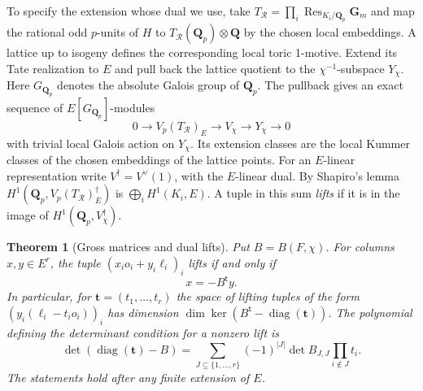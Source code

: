 \documentclass[11pt]{amsart}
\numberwithin{equation}{section}
\newtheorem{theorem}{Theorem}[section]
\theoremstyle{definition}
\theoremstyle{remark}
\newcommand{\Q}{\mathbf Q}
\newcommand{\Gm}{\mathbf G_m}
\newcommand{\Res}{\operatorname{Res}}
\begin{document}
To specify the extension whose dual we use, take
$T_{\mathcal R}=\prod_i\Res_{K_i/\Q_p}\Gm$ and map the rational
odd $p$-units of $H$ to $T_{\mathcal R}(\Q_p)\otimes\Q$ by the
chosen local embeddings. A lattice up to isogeny defines the
corresponding local toric 1-motive. Extend its Tate realization to
$E$ and pull back the lattice quotient to the $\chi^{-1}$-subspace
$Y_\chi$. Here $G_{\Q_p}$ denotes the absolute Galois group of $\Q_p$.
The pullback gives an exact sequence of $E[G_{\Q_p}]$-modules
\[
 0\longrightarrow V_p(T_{\mathcal R})_E
 \longrightarrow V_\chi\longrightarrow Y_\chi\longrightarrow0
\]
with trivial local Galois action on $Y_\chi$. Its extension classes
are the local Kummer classes of the chosen embeddings of the
lattice points. For an $E$-linear representation write $V^\dagger=V^\vee(1)$,
with the $E$-linear dual.
By Shapiro's lemma $H^1(\Q_p,V_p(T_{\mathcal R})_E^\dagger)$ is
$\bigoplus_i H^1(K_i,E)$. A tuple in this sum \emph{lifts} if it is
in the image of $H^1(\Q_p,V_\chi^\dagger)$.

\begin{theorem}[Gross matrices and dual lifts]\label{thm:cuplift}
Put $B=B(F,\chi)$. For columns $x,y\in E^r$, the tuple
$(x_i o_i+y_i\ell_i)_i$ lifts if and only if
\begin{equation}\label{eq:liftgraph}
                         x=-B^{\mathsf t}y .
\end{equation}
In particular, for $\mathbf t=(t_1,\dots,t_r)$ the space of lifting
tuples of the form $(y_i(\ell_i-t_i o_i))_i$ has dimension
$\dim\ker(B^{\mathsf t}-\operatorname{diag}(\mathbf t))$.
The polynomial defining the determinant condition for a nonzero lift is
\begin{equation}\label{eq:principal-cup}
 \det(\operatorname{diag}(\mathbf t)-B)=
 \sum_{J\subseteq\{1,\ldots,r\}}(-1)^{|J|}
 \det B_{J,J}\prod_{i\notin J}t_i .
\end{equation}
The statements hold after any finite extension of $E$.
\end{theorem}
\end{document}
